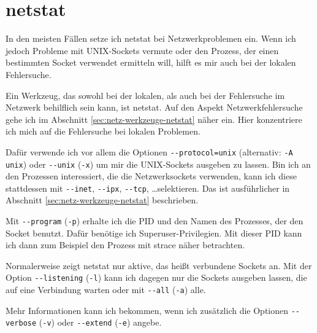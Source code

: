 \section{netstat}
\label{sec:lokal-werkzeuge-netstat}
\begin{abstractsec}
  In den meisten Fällen setze ich netstat bei Netzwerkproblemen ein.
  Wenn ich jedoch Probleme mit UNIX-Sockets vermute oder den Prozess, der
  einen bestimmten Socket verwendet ermitteln will, hilft es mir auch bei der
  lokalen Fehlersuche.
\end{abstractsec}
\begin{normaltext}
  Ein Werkzeug, das sowohl bei der lokalen, als auch bei der Fehlersuche im
  Netzwerk behilflich sein kann, ist netstat. Auf den Aspekt
  Netzwerkfehlersuche gehe ich im Abschnitt \ref{sec:netz-werkzeuge-netstat}
  näher ein. Hier konzentriere ich mich auf die Fehlersuche bei lokalen
  Problemen.

  Dafür verwende ich vor allem die Optionen \verb?--protocol=unix?
  (alternativ: \verb?-A unix?) oder \verb?--unix? (\verb?-x?) um mir die
  UNIX-Sockets ausgeben zu lassen.
  Bin ich an den Prozessen interessiert, die die Netzwerksockets verwenden,
  kann ich diese stattdessen mit \verb?--inet?, \verb?--ipx?, \verb?--tcp?,
  \ldots selektieren. Das ist ausführlicher in Abschnitt
  \ref{sec:netz-werkzeuge-netstat} beschrieben.

  Mit \verb?--program? (\verb?-p?) erhalte ich die PID und den Namen des
  Prozesses, der den Socket benutzt. Dafür benötige ich Superuser-Privilegien.
  Mit dieser PID kann ich dann zum Beispiel den Prozess mit strace näher
  betrachten.

  Normalerweise zeigt netstat nur aktive, das heißt verbundene Sockets an. Mit
  der Option \verb?--listening? (\verb?-l?) kann ich dagegen nur die Sockets
  ausgeben lassen, die auf eine Verbindung warten oder mit \verb?--all?
  (\verb?-a?) alle.

  Mehr Informationen kann ich bekommen, wenn ich zusätzlich die Optionen
  \verb?--verbose? (\verb?-v?) oder \verb?--extend? (\verb?-e?) angebe.


\end{normaltext}
